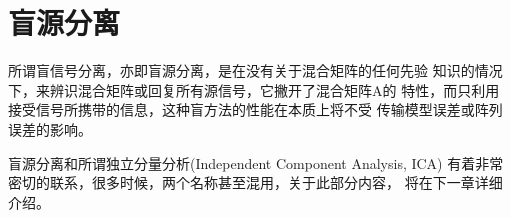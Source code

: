 \section{盲源分离}
所谓盲信号分离，亦即盲源分离，是在没有关于混合矩阵的任何先验
知识的情况下，来辨识混合矩阵或回复所有源信号，它撇开了混合矩阵A的
特性，而只利用接受信号所携带的信息，这种盲方法的性能在本质上将不受
传输模型误差或阵列误差的影响。

盲源分离和所谓独立分量分析(Independent Component Analysis, ICA)
有着非常密切的联系，很多时候，两个名称甚至混用，关于此部分内容，
将在下一章详细介绍。


